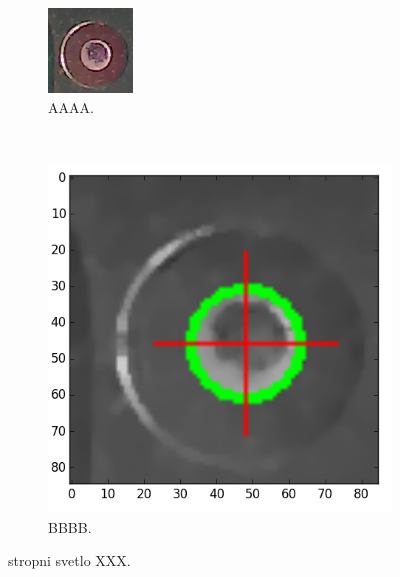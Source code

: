 \begin{figure}[H]
	\centering
	\begin{subfigure}[b]{0.4\textwidth}
		\centering
		\includegraphics[width=0.7\linewidth, trim = 0cm -0.2cm 0cm 0cm]{obrazky/fiduc_svetlostrop_crop.png}%
		\caption{AAAA.}
		\label{fig:strop}
	\end{subfigure}
	~
	\begin{subfigure}[b]{0.4\textwidth}
		\centering
		\includegraphics[width=0.8\linewidth]{obrazky/fiduc_svetlostrop_crop3.png}%
		\caption{BBBB.}
		\label{fig:strop2}
	\end{subfigure}

	\caption{stropni svetlo XXX.}
\end{figure}





